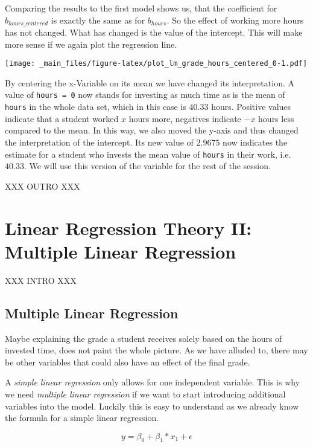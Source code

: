 \documentclass[
]{book}
\begin{document}
Comparing the results to the first model shows us, that the coefficient for
\(b_{hours\_centered}\) is exactly the same as for \(b_{hours}\). So the effect
of working more hours has not changed. What has changed is the value of the
intercept. This will make more sense if we again plot the regression line.

\texttt{[image: \_main\_files/figure-latex/plot\_lm\_grade\_hours\_centered\_0-1.pdf]}

By centering the x-Variable on its mean we have changed its interpretation.
A value of \texttt{hours\ =\ 0} now stands for investing as much time as is the mean
of \texttt{hours} in the whole data set, which in this case is \(40.33\) hours. Positive
values indicate that a student worked \(x\) hours more, negatives indicate \(-x\)
hours less compared to the mean. In this way, we also moved the y-axis and thus
changed the interpretation of the intercept. Its new value of \(2.9675\) now
indicates the estimate for a student who invests the mean value of \texttt{hours} in
their work, i.e.~\(40.33\). We will use this version of the variable for the rest
of the session.

XXX OUTRO XXX

\hypertarget{lin-t-2}{%
\chapter{Linear Regression Theory II: Multiple Linear Regression}\label{lin-t-2}}

XXX INTRO XXX

\hypertarget{multiple-linear-regression}{%
\section{Multiple Linear Regression}\label{multiple-linear-regression}}

Maybe explaining the grade a student receives solely based on the hours of
invested time, does not paint the whole picture. As we have alluded to, there
may be other variables that could also have an effect of the final grade.

A \emph{simple linear regression} only allows for one independent variable. This is
why we need \emph{multiple linear regression} if we want to start introducing
additional variables into the model. Luckily this is easy to understand as we
already know the formula for a simple linear regression.

\[y = \beta_0 + \beta_1*x_1 + \epsilon\]
\end{document}
